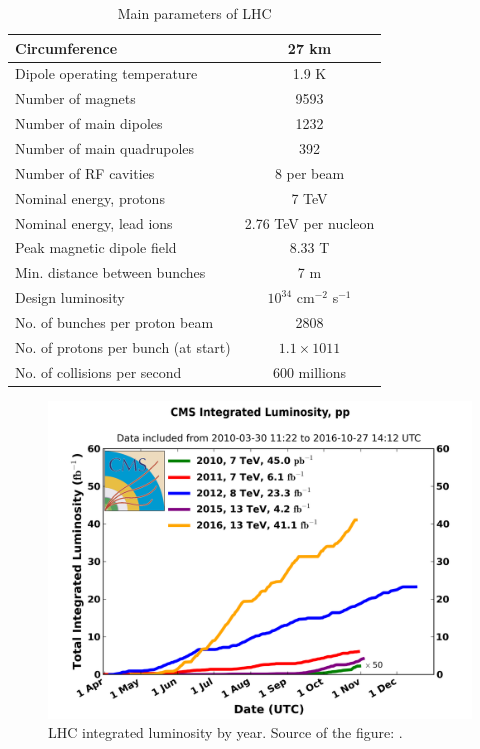 \begin{table}[h]
  \begin{center}
  \caption{ Main parameters of LHC \cite{ref_LHC_brochure}}
  \vspace{5 mm}
  \begin{tabular}{|l|c|}
     \hline
     Circumference & 27 km  \\ \hline
     Dipole operating temperature &  1.9 K \\ \hline
     Number of magnets &  9593 \\ \hline
     Number of main dipoles &  1232 \\ \hline
     Number of main quadrupoles &  392 \\ \hline
     Number of RF cavities &  8 per beam \\ \hline
     Nominal energy, protons &  7 TeV \\ \hline
     Nominal energy, lead ions &  2.76 TeV per nucleon \\ \hline
     Peak magnetic dipole field &  8.33 T \\ \hline
     Min. distance between bunches &  7 m \\ \hline
     Design luminosity &  $10^{34}$ cm$^{-2}$ s$^{-1}$ \\ \hline
     No. of bunches per proton beam &  2808 \\ \hline
     No. of protons per bunch (at start) &  $1.1\times 10{11}$ \\ \hline
     No. of collisions per second &  600 millions \\ \hline
  \end{tabular}
  \label{tab:LHCparameters}
  \end{center}
 \end{table}

\begin{figure}
  \centering
  \includegraphics[width=.80\linewidth]{../figs/Exp/int_lumi_cumulative_pp_2.png}
  \caption{LHC integrated luminosity by year. Source of the figure: \cite{ref_fig_LHClumi}.}
  \label{fig:LHClumi}
\end{figure}

